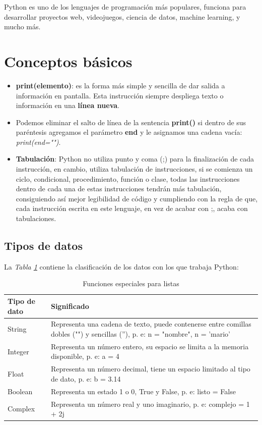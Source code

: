 
Python es uno de los lenguajes de programación más populares, funciona para desarrollar proyectos web, videojuegos, ciencia de datos, machine learning, y mucho más.



\section{Conceptos básicos}
\begin{itemize}
	\item \textbf{print(elemento)}: es la forma más simple y sencilla de dar salida a información en pantalla. Esta instrucción siempre despliega texto o información en una \textbf{línea nueva}.
	\item Podemos eliminar el salto de línea de la sentencia \textbf{print()} si dentro de sus paréntesis agregamos el parámetro \textbf{end} y le asignamos una cadena vacía: \textit{print(end="")}.
	\item \textbf{Tabulación}: Python no utiliza punto y coma (;) para la finalización de cada instrucción, en cambio, utiliza tabulación de instrucciones, si se comienza un ciclo, condicional, procedimiento, función o clase, todas las instrucciones dentro de cada una de estas instrucciones tendrán más tabulación, consiguiendo así mejor legibilidad de código y cumpliendo con la regla de que, cada instrucción escrita en este lenguaje, en vez de acabar con ;, acaba con tabulaciones.
\end{itemize}


\subsection{Tipos de datos}
\hspace{0.55cm}La \textit{Tabla \ref{tab: 1}} contiene la clasificación de los datos con los que trabaja Python:
\begin{table}[H]
    \begin{center}
        \caption{Funciones especiales para listas}
        \label{tab: 1}
        \begin{tabular}{m{4cm}|m{8cm}}
            \hline
            \textbf{Tipo de dato} & \textbf{Significado} \\
            \hline
            String		& Representa una cadena de texto, puede contenerse entre comillas dobles ("") y sencillas (''), p. e: n = "nombre", n = 'mario' \\
            Integer		& Representa un número entero, su espacio se limita a la memoria disponible, p. e: a = 4 \\
            Float		& Representa un número decimal, tiene un espacio limitado al tipo de dato, p. e: b = 3.14 \\
            Boolean		& Representa un estado 1 o 0, True y False, p. e: listo = False \\
            Complex		& Representa un número real y uno imaginario, p. e: complejo = 1 + 2j \\
            \hline
        \end{tabular}
    \end{center}    
\end{table}


